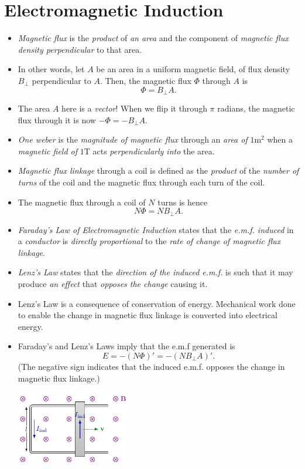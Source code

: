 \documentclass[oneside]{book}
\begin{document}
\chapter{Electromagnetic Induction}
\begin{itemize}
    \item \emph{Magnetic flux} is the \emph{product} of \emph{an area} and the component of \emph{magnetic flux density perpendicular} to that area.
    \item In other words, let \(A\) be an area in a uniform magnetic field, of flux density \(B_\perp\) perpendicular to \(A\). Then, the magnetic flux \(\Phi\) through \(A\) is
    \[\Phi=B_\perp A.\]
    \item The area \(A\) here is a \emph{vector}! When we flip it through \(\pi\) radians, the magnetic flux through it is now \(-\Phi=-B_\perp A\). 
    \item \emph{One weber} is the \emph{magnitude of magnetic flux} through an \emph{area of} \(1\text{m}^2\) when a \emph{magnetic field of} \(1\text{T}\) acts \emph{perpendicularly into} the area.
    \item \emph{Magnetic flux linkage} through a coil is defined as the \emph{product} of the \emph{number of turns} of the coil and the magnetic flux through each turn of the coil.
    \item The magnetic flux through a coil of \(N\) turns is hence
    \[N\Phi=NB_\perp A.\]
    \item \emph{Faraday's Law of Electromagnetic Induction} states that the \emph{e.m.f. induced} in a \emph{conductor} is \emph{directly proportional} to the \emph{rate of change of magnetic flux linkage}.
    \item \emph{Lenz's Law} states that the \emph{direction of the induced e.m.f.} is such that it may produce \emph{an effect} that \emph{opposes the change} causing it.
    \item Lenz's Law is a consequence of conservation of energy. Mechanical work done to enable the change in magnetic flux linkage is converted into electrical energy.
    \item Faraday's and Lenz's Laws imply that the e.m.f generated is
    \[E=-(N\Phi)'=-(NB_\perp A)'.\]
    (The negative sign indicates that the induced e.m.f. opposes the change in magnetic flux linkage.)
    \begin{center}
        \includegraphics[width=0.4\textwidth,page=4]{../images/Lenz's-Law/Lenz's-Law.pdf}

\end{center}
\end{itemize}
\end{document}
